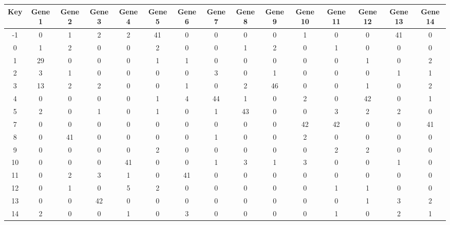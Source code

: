 \begin{tabular}{|c|c|c|c|c|c|c|c|c|c|c|c|c|c|c|}
\hline
Key & Gene 1 & Gene 2 & Gene 3 & Gene 4 & Gene 5 & Gene 6 & Gene 7 & Gene 8 & Gene 9 & Gene 10 & Gene 11 & Gene 12 & Gene 13 & Gene 14 \\
\hline
-1 & 0 & 1 & 2 & 2 & 41 & 0 & 0 & 0 & 0 & 1 & 0 & 0 & 41 & 0 \\
0 & 1 & 2 & 0 & 0 & 2 & 0 & 0 & 1 & 2 & 0 & 1 & 0 & 0 & 0 \\
1 & 29 & 0 & 0 & 0 & 1 & 1 & 0 & 0 & 0 & 0 & 0 & 1 & 0 & 2 \\
2 & 3 & 1 & 0 & 0 & 0 & 0 & 3 & 0 & 1 & 0 & 0 & 0 & 1 & 1 \\
3 & 13 & 2 & 2 & 0 & 0 & 1 & 0 & 2 & 46 & 0 & 0 & 1 & 0 & 2 \\
4 & 0 & 0 & 0 & 0 & 1 & 4 & 44 & 1 & 0 & 2 & 0 & 42 & 0 & 1 \\
5 & 2 & 0 & 1 & 0 & 1 & 0 & 1 & 43 & 0 & 0 & 3 & 2 & 2 & 0 \\
7 & 0 & 0 & 0 & 0 & 0 & 0 & 0 & 0 & 0 & 42 & 42 & 0 & 0 & 41 \\
8 & 0 & 41 & 0 & 0 & 0 & 0 & 1 & 0 & 0 & 2 & 0 & 0 & 0 & 0 \\
9 & 0 & 0 & 0 & 0 & 2 & 0 & 0 & 0 & 0 & 0 & 2 & 2 & 0 & 0 \\
10 & 0 & 0 & 0 & 41 & 0 & 0 & 1 & 3 & 1 & 3 & 0 & 0 & 1 & 0 \\
11 & 0 & 2 & 3 & 1 & 0 & 41 & 0 & 0 & 0 & 0 & 0 & 0 & 0 & 0 \\
12 & 0 & 1 & 0 & 5 & 2 & 0 & 0 & 0 & 0 & 0 & 1 & 1 & 0 & 0 \\
13 & 0 & 0 & 42 & 0 & 0 & 0 & 0 & 0 & 0 & 0 & 0 & 1 & 3 & 2 \\
14 & 2 & 0 & 0 & 1 & 0 & 3 & 0 & 0 & 0 & 0 & 1 & 0 & 2 & 1 \\
\hline
\end{tabular}